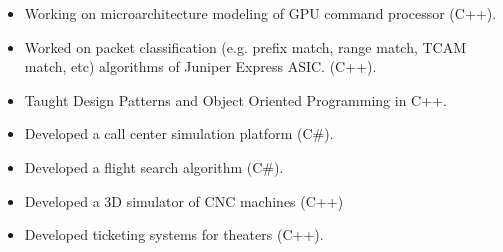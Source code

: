 \begin{itemize}
	\item Working on microarchitecture modeling of GPU command processor (C++).
\end{itemize}

\divider

\begin{itemize}
	\item Worked on packet classification (e.g. prefix match, range match, TCAM match, etc) algorithms of Juniper Express ASIC. (C++).
\end{itemize}

\divider

\begin{itemize}
	\item Taught Design Patterns and Object Oriented Programming in C++.
\end{itemize}

\divider

\begin{itemize}
	\item Developed a call center simulation platform (C\#).
\end{itemize}

\divider

\begin{itemize}
	\item Developed a flight search algorithm (C\#).
\end{itemize}

\divider

\begin{itemize}
\item Developed a 3D simulator of CNC machines (C++)
\end{itemize}

\divider

\begin{itemize}
	\item Developed ticketing systems for theaters (C++).
\end{itemize}

